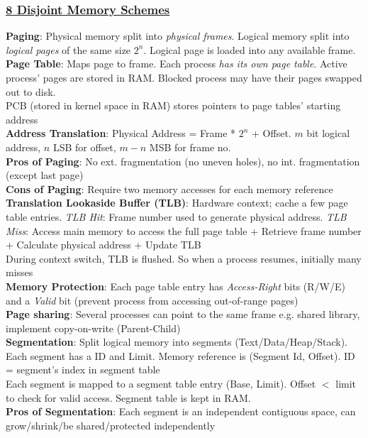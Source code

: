 \documentclass{article}
\begin{document}
{\begin{multicols*}{3}
\subsubsection*{\underline{8 Disjoint Memory Schemes}}
\textbf{Paging}: Physical memory split into \textit{physical frames}. Logical memory split into \textit{logical pages} of the same size $2^n$. Logical page is loaded into any available frame. \\
\textbf{Page Table}: Maps page to frame. Each process \textit{has its own page table}. Active process' pages are stored in RAM. Blocked process may have their pages swapped out to disk. \\
PCB (stored in kernel space in RAM) stores pointers to page tables' starting address\\
\textbf{Address Translation}: Physical Address = Frame * $2^n$ + Offset. $m$ bit logical address, $n$ LSB for offset, $m-n$ MSB for frame no.\\
\textbf{Pros of Paging}: No ext. fragmentation (no uneven holes), no int. fragmentation (except last page) \\
\textbf{Cons of Paging}: Require two memory accesses for each memory reference\\
\textbf{Translation Lookaside Buffer (TLB)}: Hardware context; cache a few page table entries. \textit{TLB Hit}: Frame number used to generate physical address. \textit{TLB Miss}: Access main memory to access the full page table + Retrieve frame number + Calculate physical address + Update TLB\\
During context switch, TLB is flushed. So when a process resumes,  initially many misses\\
\textbf{Memory Protection}: Each page table entry has \textit{Access-Right} bits (R/W/E) and a \textit{Valid} bit (prevent process from accessing out-of-range pages)\\
\textbf{Page sharing}: Several processes can point to the same frame e.g. shared library, implement copy-on-write (Parent-Child)\\
\textbf{Segmentation}: Split logical memory into segments (Text/Data/Heap/Stack). Each segment has a ID and Limit. Memory reference is (Segment Id, Offset). ID = segment's index in segment table \\
Each segment is mapped to a segment table entry (Base, Limit). Offset $<$ limit to check for valid access. Segment table is kept in RAM. \\
\textbf{Pros of Segmentation}: Each segment is an independent contiguous space, can grow/shrink/be shared/protected independently\\

\end{multicols*}}
\end{document}
